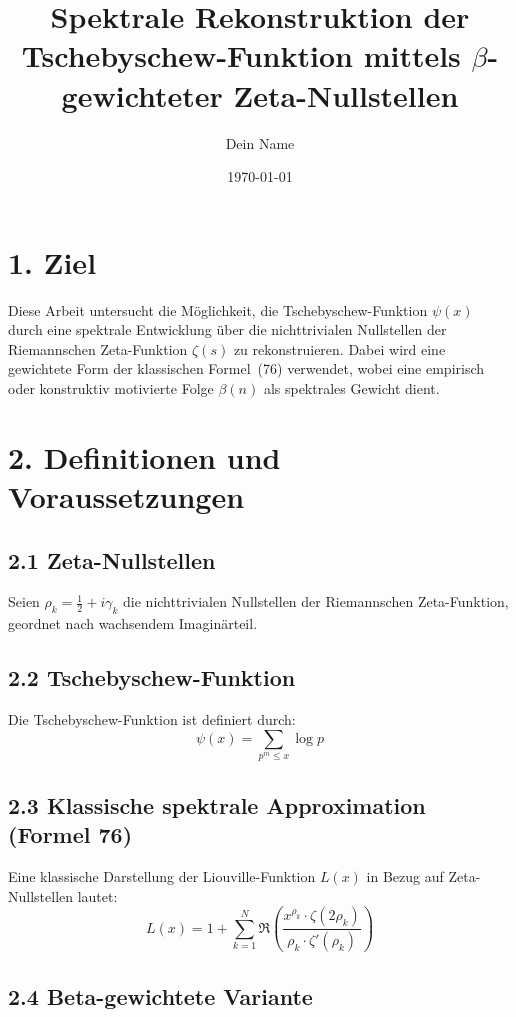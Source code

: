 \documentclass[12pt]{article}
\title{Spektrale Rekonstruktion der Tschebyschew-Funktion mittels \(\beta\)-gewichteter Zeta-Nullstellen}
\author{Dein Name}
\date{\today}
\begin{document}
\maketitle

\section*{1. Ziel}

Diese Arbeit untersucht die Möglichkeit, die Tschebyschew-Funktion \(\psi(x)\) durch eine spektrale Entwicklung über die nichttrivialen Nullstellen der Riemannschen Zeta-Funktion \(\zeta(s)\) zu rekonstruieren. Dabei wird eine gewichtete Form der klassischen Formel~(76) verwendet, wobei eine empirisch oder konstruktiv motivierte Folge \(\beta(n)\) als spektrales Gewicht dient.

\section*{2. Definitionen und Voraussetzungen}

\subsection*{2.1 Zeta-Nullstellen}

Seien \(\rho_k = \tfrac{1}{2} + i\gamma_k\) die nichttrivialen Nullstellen der Riemannschen Zeta-Funktion, geordnet nach wachsendem Imaginärteil.

\subsection*{2.2 Tschebyschew-Funktion}

Die Tschebyschew-Funktion ist definiert durch:
\[
\psi(x) = \sum_{p^m \leq x} \log p
\]

\subsection*{2.3 Klassische spektrale Approximation (Formel 76)}

Eine klassische Darstellung der Liouville-Funktion \(L(x)\) in Bezug auf Zeta-Nullstellen lautet:
\[
L(x) = 1 + \sum_{k=1}^{N} \Re \left( \frac{x^{\rho_k} \cdot \zeta(2\rho_k)}{\rho_k \cdot \zeta'(\rho_k)} \right)
\]

\subsection*{2.4 Beta-gewichtete Variante}
\end{document}
